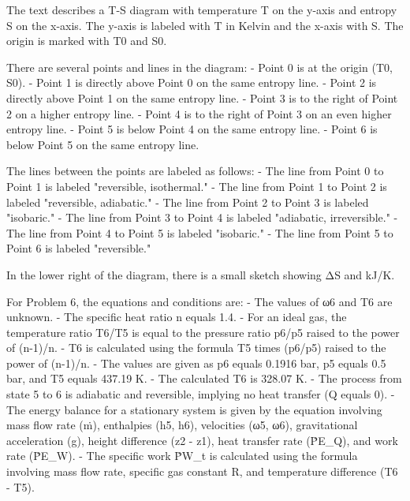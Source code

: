 The text describes a T-S diagram with temperature T on the y-axis and entropy S on the x-axis. The y-axis is labeled with T in Kelvin and the x-axis with S. The origin is marked with T0 and S0.

There are several points and lines in the diagram:
- Point 0 is at the origin (T0, S0).
- Point 1 is directly above Point 0 on the same entropy line.
- Point 2 is directly above Point 1 on the same entropy line.
- Point 3 is to the right of Point 2 on a higher entropy line.
- Point 4 is to the right of Point 3 on an even higher entropy line.
- Point 5 is below Point 4 on the same entropy line.
- Point 6 is below Point 5 on the same entropy line.

The lines between the points are labeled as follows:
- The line from Point 0 to Point 1 is labeled "reversible, isothermal."
- The line from Point 1 to Point 2 is labeled "reversible, adiabatic."
- The line from Point 2 to Point 3 is labeled "isobaric."
- The line from Point 3 to Point 4 is labeled "adiabatic, irreversible."
- The line from Point 4 to Point 5 is labeled "isobaric."
- The line from Point 5 to Point 6 is labeled "reversible."

In the lower right of the diagram, there is a small sketch showing ΔS and kJ/K.

For Problem 6, the equations and conditions are:
- The values of ω6 and T6 are unknown.
- The specific heat ratio n equals 1.4.
- For an ideal gas, the temperature ratio T6/T5 is equal to the pressure ratio p6/p5 raised to the power of (n-1)/n.
- T6 is calculated using the formula T5 times (p6/p5) raised to the power of (n-1)/n.
- The values are given as p6 equals 0.1916 bar, p5 equals 0.5 bar, and T5 equals 437.19 K.
- The calculated T6 is 328.07 K.
- The process from state 5 to 6 is adiabatic and reversible, implying no heat transfer (Q equals 0).
- The energy balance for a stationary system is given by the equation involving mass flow rate (ṁ), enthalpies (h5, h6), velocities (ω5, ω6), gravitational acceleration (g), height difference (z2 - z1), heat transfer rate (ṖE_Q), and work rate (ṖE_W).
- The specific work ṖW_t is calculated using the formula involving mass flow rate, specific gas constant R, and temperature difference (T6 - T5).